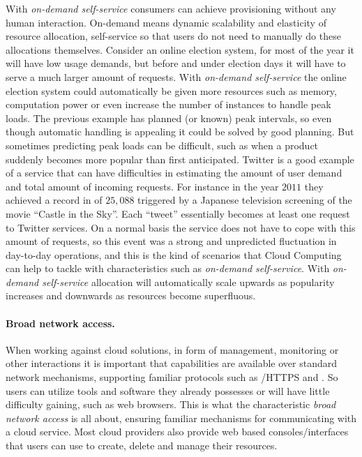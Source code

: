 With \emph{on-demand self-service} consumers can achieve provisioning without any human interaction.
On-demand means dynamic scalability and elasticity of resource allocation,
self-service so that users do not need to manually do these allocations themselves.
Consider an online election system, for most of the year it will have 
low usage demands, but before and under election days it will have to serve
a much larger amount of requests. With \emph{on-demand self-service} the online election system
could automatically be given more resources such as memory, computation power or even
increase the number of instances to handle peak loads.
The previous example has planned (or known) peak intervals, so even though automatic handling
is appealing it could be solved by good planning. 
But sometimes predicting peak loads can be difficult, such as when a product suddenly
becomes more popular than first anticipated.
Twitter is a good example of a service that can have difficulties in estimating 
the amount of user demand and total amount of incoming requests.
For instance in the year $2011$ they achieved a record in  of
$25,088$ triggered by a Japanese television screening of the movie ``Castle in the Sky''.
Each ``tweet'' essentially becomes at least one request to Twitter services.
On a normal basis the service does not have to cope with this amount of requests, so
this event was a strong and unpredicted fluctuation in day-to-day operations,
and this is the kind of scenarios that Cloud Computing can help to tackle with
characteristics such as \emph{on-demand self-service}.
With \emph{on-demand self-service} allocation will automatically scale upwards as popularity increases 
and downwards as resources become superfluous.

\paragraph{Broad network access.}

When working against cloud solutions, in form of management, monitoring or other 
interactions it is important that capabilities are available over standard network mechanisms,
supporting familiar protocols such as /HTTPS and .
So users can utilize tools and software they already possesses
or will have little difficulty gaining, such as web browsers.
This is what the characteristic \emph{broad network access} is all about,
ensuring familiar mechanisms for communicating with a cloud service.
Most cloud providers also provide web based consoles/interfaces that users can use
to create, delete and manage their resources.

